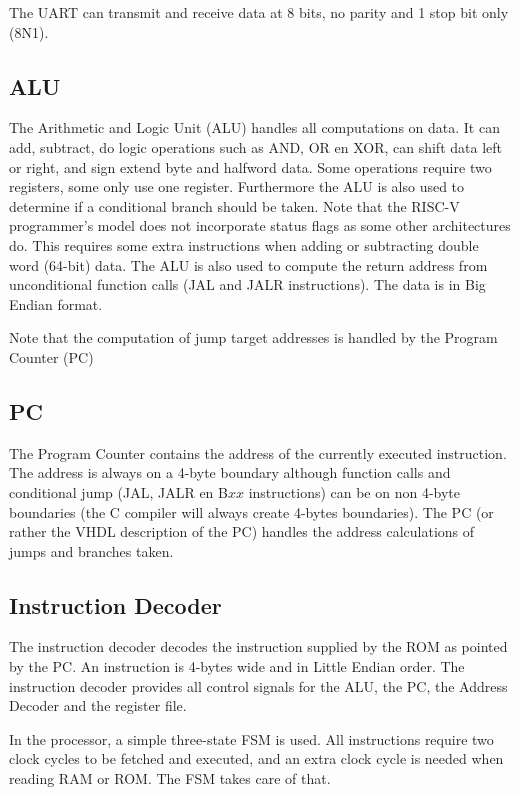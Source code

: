 \documentclass[12pt]{article}
\begin{document}
The UART can transmit and receive data at 8 bits, no parity and 1 stop bit only (8N1).

\subsection{ALU}
\label{sec:alu}
The Arithmetic and Logic Unit (ALU) handles all computations on data. It can add, subtract, do logic operations such as AND, OR en XOR, can shift data left or right, and sign extend byte and halfword data. Some operations require two registers, some only use one register. Furthermore the ALU is also used to determine if a conditional branch should be taken. Note that the RISC-V programmer's model does not incorporate status flags as some other architectures do. This requires some extra instructions when adding or subtracting double word (64-bit) data. The ALU is also used to compute the return address from unconditional function calls (JAL and JALR instructions). The data is in Big Endian format.

Note that the computation of jump target addresses is handled by the Program Counter (PC)

\subsection{PC}
\label{sec:pc}
The Program Counter contains the address of the currently executed instruction. The address is always on a 4-byte boundary although function calls and conditional jump (JAL, JALR en B$xx$ instructions) can be on non 4-byte boundaries (the C compiler will always create 4-bytes boundaries). The PC (or rather the VHDL description of the PC) handles the address calculations of jumps and branches taken.

\subsection{Instruction Decoder}
\label{sec:instructiondecoder}
The instruction decoder decodes the instruction supplied by the ROM as pointed by the PC. An instruction is 4-bytes wide and in Little Endian order. The instruction decoder provides all control signals for the ALU, the PC, the Address Decoder and the register file.

In the processor, a simple three-state FSM is used. All instructions require two clock cycles to be fetched and executed, and an extra clock cycle is needed when reading RAM or ROM. The FSM takes care of that.
\end{document}

